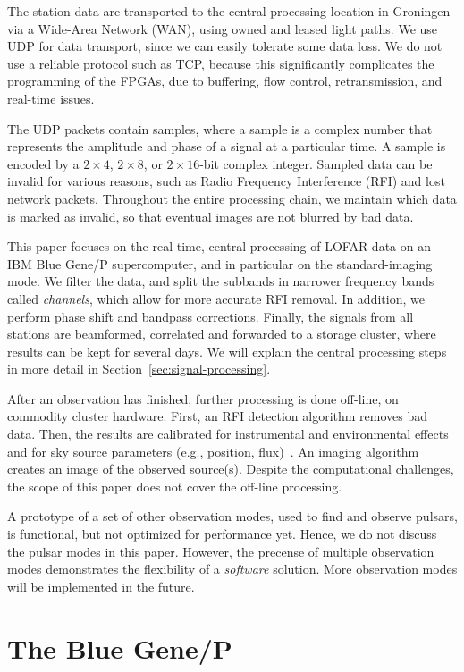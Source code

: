 \documentclass{sig-alternate}
\begin{document}
The station data are transported to the central processing location in
Groningen via a Wide-Area Network (WAN), using owned and leased light paths.
We use UDP for data transport, since we can easily tolerate some data loss.
We do not use a reliable protocol such as TCP, because this significantly
complicates the programming of the FPGAs, due to buffering, flow control,
retransmission, and real-time issues.

The UDP packets contain samples, where a sample is a complex number
that represents the amplitude and phase of a signal at a particular
time.  A sample is encoded by a $2\times4$, $2\times8$, or $2\times16$-bit
complex integer. Sampled data can be invalid for various reasons, such as
Radio Frequency Interference (RFI) and lost network packets.
Throughout the entire processing chain, we maintain which
data is marked as invalid, so that eventual images are not blurred by
bad data.  

This paper focuses on the real-time, central processing of LOFAR data on
an IBM Blue Gene/P supercomputer, and in particular on the standard-imaging
mode.
We filter the data, and split the subbands in narrower frequency bands called
\emph{channels}, which allow for more accurate RFI removal.
In addition, we perform phase shift and bandpass corrections.
Finally, the signals from all stations are beamformed,
correlated and forwarded to a storage cluster, where results can be
kept for several days.  We will explain the central processing steps
in more detail in Section~\ref{sec:signal-processing}.

After an observation has finished, further processing is done off-line, on
commodity cluster hardware. 
First, an RFI detection algorithm removes bad data.
Then, the results are calibrated for instrumental and environmental effects and
for sky source parameters (e.g., position, flux)~\cite{Nijboer:07}.
An imaging algorithm creates an image of the observed source(s).
Despite the computational challenges, the scope of this paper does not cover
the off-line processing.

A prototype of a set of other observation modes, used to find and observe
pulsars, is functional, but not optimized for performance yet.
Hence, we do not discuss the pulsar modes in this paper.
However, the precense of multiple observation modes demonstrates the
flexibility of a \emph{software\/} solution.
More observation modes will be implemented in the future.


\section{The Blue Gene/P}
\end{document}
